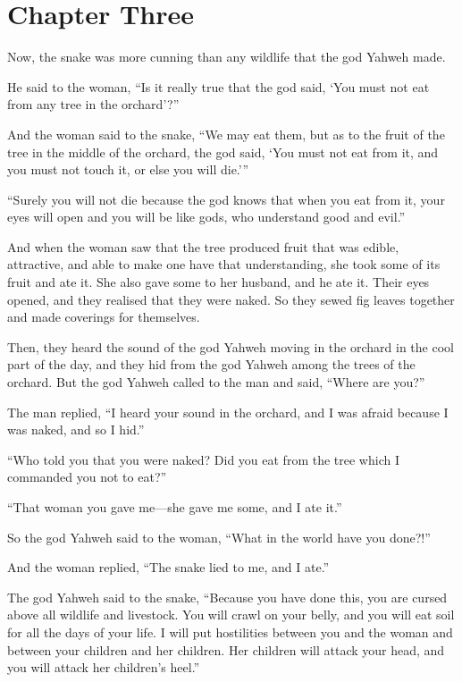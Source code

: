 \chapter*{Chapter Three}

Now, the snake was more cunning than any wildlife that the god Yahweh made. 

He said to the woman, 
\enquote{Is it really true that the god said, 
    \enquote{You must not eat from any tree in the orchard}?}

And the woman said to the snake, 
\enquote{We may eat them, but as to the fruit of the tree in the middle of the orchard, 
the god said, \enquote{You must not eat from it, and you must not touch it, 
or else you will die.}}

\enquote{Surely you will not die because the god knows that when you eat from it, 
your eyes will open and you will be like gods, 
who understand good and evil.}

And when the woman saw that the tree produced fruit that 
was edible, attractive, and able to make one have that understanding, 
she took some of its fruit and ate it. 
She also gave some to her husband, and he ate it. 
Their eyes opened, and they realised that they were naked. 
So they sewed fig leaves together and made coverings for themselves.

Then, 
they heard the sound of the god Yahweh moving in the orchard 
in the cool part of the day, 
and they hid from the god Yahweh among the trees of the orchard. 
But the god Yahweh called to the man and said, \enquote{Where are you?}

The man replied, 
\enquote{I heard your sound in the orchard, 
and I was afraid because I was naked, 
and so I hid.}

\enquote{Who told you that you were naked? 
Did you eat from the tree which I commanded you not to eat?}

\enquote{That woman you gave me---she gave me some, and I ate it.}

So the god Yahweh said to the woman, \enquote{What in the world have you done?!}

And the woman replied, \enquote{The snake lied to me, and I ate.}

The god Yahweh said to the snake, 
\enquote{Because you have done this, 
you are cursed above all wildlife and livestock.
You will crawl on your belly, 
and you will eat soil 
for all the days of your life. 
I will put hostilities between you and the woman 
and between your children and her children. 
Her children will attack your head, 
and you will attack her children's heel.} 

